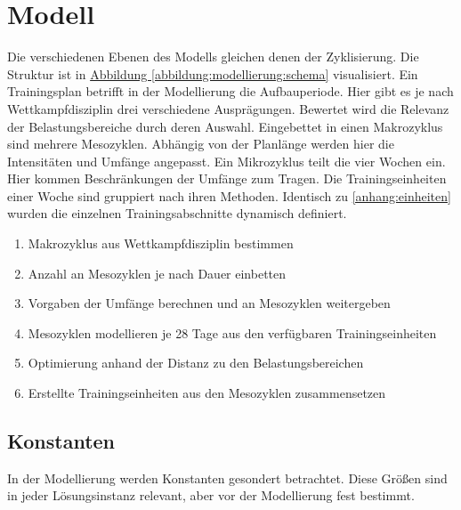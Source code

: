 \section{Modell}
\label{sec:modellierung:model}
Die verschiedenen Ebenen des Modells gleichen denen der Zyklisierung. Die Struktur ist in \hyperref[abbildung:modellierung:schema]{Abbildung \ref{abbildung:modellierung:schema}} visualisiert. Ein Trainingsplan betrifft in der Modellierung die Aufbauperiode. Hier gibt es je nach Wettkampfdisziplin drei verschiedene Ausprägungen. Bewertet wird die Relevanz der Belastungsbereiche durch deren Auswahl. Eingebettet in einen Makrozyklus sind mehrere Mesozyklen. Abhängig von der Planlänge werden hier die Intensitäten und Umfänge angepasst. Ein Mikrozyklus teilt die vier Wochen ein. Hier kommen Beschränkungen der Umfänge zum Tragen. Die Trainingseinheiten einer Woche sind gruppiert nach ihren Methoden. Identisch zu \ref{anhang:einheiten} wurden die einzelnen Trainingsabschnitte dynamisch definiert.
\begin{enumerate}[parsep=2pt, topsep=0pt]
    \item Makrozyklus aus Wettkampfdisziplin bestimmen 
    \item Anzahl an Mesozyklen je nach Dauer einbetten
    \item Vorgaben der Umfänge berechnen und an Mesozyklen weitergeben
    \item Mesozyklen modellieren je 28 Tage aus den verfügbaren Trainingseinheiten
    \item Optimierung anhand der Distanz zu den Belastungsbereichen
    \item Erstellte Trainingseinheiten aus den Mesozyklen zusammensetzen
\end{enumerate}

\subsection{Konstanten}
In der Modellierung werden Konstanten gesondert betrachtet. Diese Größen sind in jeder Lösungsinstanz relevant, aber vor der Modellierung fest bestimmt. 

